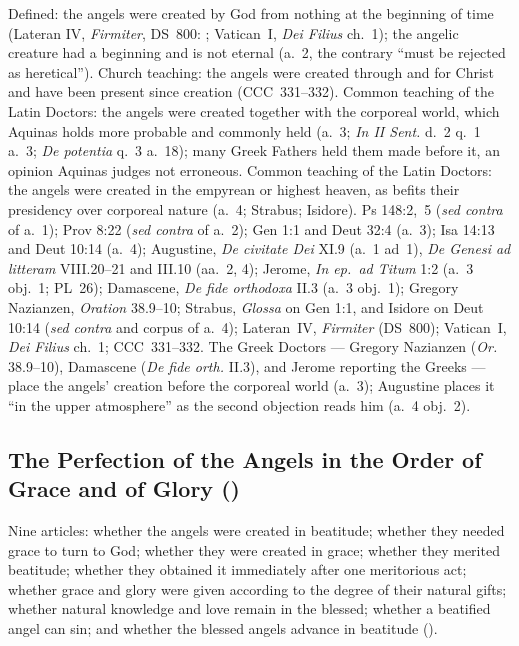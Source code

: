  {Defined: the angels were created by God from nothing at the beginning
 of time (Lateran IV,
 \emph{Firmiter}, DS~800: ; Vatican~I, \emph{Dei Filius} ch.~1); the
 angelic creature had a beginning and is not eternal (a.~2, the contrary
 ``must be rejected as heretical''). Church teaching: the angels were
 created through and for Christ and have been present since creation
 (CCC~331--332). Common teaching of the Latin Doctors: the angels were
 created together with the corporeal world, which Aquinas holds more
 probable and commonly held (a.~3; \emph{In II Sent.} d.~2 q.~1 a.~3;
 \emph{De potentia} q.~3 a.~18); many Greek Fathers held them made
 before it, an opinion Aquinas judges not erroneous. Common teaching
 of the Latin Doctors: the angels were created in the empyrean or
 highest heaven, as befits their presidency over corporeal nature (a.~4;
 Strabus; Isidore).}
 {Ps 148:2,~5 (\emph{sed contra} of a.~1); Prov 8:22 (\emph{sed contra}
 of a.~2); Gen 1:1 and Deut 32:4 (a.~3); Isa 14:13 and Deut 10:14
 (a.~4); Augustine, \emph{De civitate Dei} XI.9 (a.~1 ad~1), \emph{De
 Genesi ad litteram} VIII.20--21 and III.10 (aa.~2, 4); Jerome, \emph{In
 ep.~ad Titum} 1:2 (a.~3 obj.~1; PL~26); Damascene, \emph{De fide
 orthodoxa} II.3 (a.~3 obj.~1); Gregory Nazianzen, \emph{Oration}
 38.9--10; Strabus, \emph{Glossa} on Gen 1:1, and Isidore on Deut 10:14
 (\emph{sed contra} and corpus of a.~4); Lateran~IV, \emph{Firmiter}
 (DS~800); Vatican~I, \emph{Dei Filius} ch.~1; CCC~331--332.}
 {The Greek Doctors --- Gregory Nazianzen (\emph{Or.} 38.9--10),
 Damascene (\emph{De fide orth.} II.3), and Jerome reporting the Greeks
 --- place the angels' creation before the corporeal world (a.~3);
 Augustine places it ``in the upper atmosphere'' as the second objection
 reads him (a.~4 obj.~2).}

\subsection{The Perfection of the Angels in the Order of Grace and of
Glory ()}\label{sec:q62}

Nine articles: whether the angels were created in beatitude; whether
they needed grace to turn to God; whether they were created in grace;
whether they merited beatitude; whether they obtained it immediately
after one meritorious act; whether grace and glory were given according
to the degree of their natural gifts; whether natural knowledge and love
remain in the blessed; whether a beatified angel can sin; and whether
the blessed angels advance in beatitude ().

